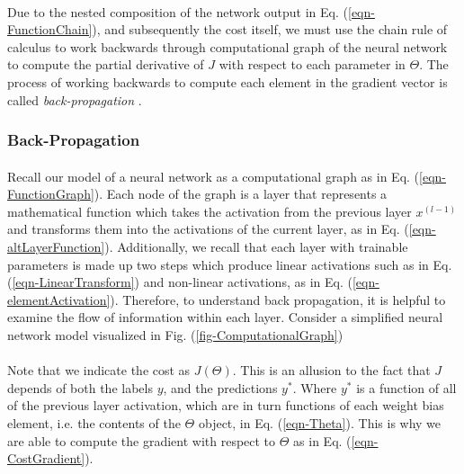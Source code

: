\documentclass[12pt,letterpaper]{article}
\begin{document}
\paragraph*{}Due to the nested composition of the network output in Eq. (\ref{eqn-FunctionChain}), and subsequently the cost itself, we must use the chain rule of calculus to work backwards through computational graph of the neural network to compute the partial derivative of $J$ with respect to each parameter in $\Theta$. The process of working backwards to compute each element in the gradient vector is called \textit{back-propagation} \cite{Geron,Goodfellow,Loy}. 




\subsubsection{Back-Propagation}
\label{subsubsec-BackProp}

\paragraph*{}Recall our model of a neural network as a computational graph as in Eq. (\ref{eqn-FunctionGraph}). Each node of the graph is a layer that represents a mathematical function which takes the activation from the previous layer $x^{(l-1)}$ and transforms them into the activations of the current layer, as in Eq. (\ref{eqn-altLayerFunction}). Additionally, we recall that each layer with trainable parameters is made up two steps which produce linear activations such as in Eq. (\ref{eqn-LinearTransform}) and non-linear activations, as in Eq. (\ref{eqn-elementActivation}). Therefore, to understand back propagation, it is helpful to examine the flow of information within each layer. Consider a simplified neural network model visualized in Fig. (\ref{fig-ComputationalGraph})

\paragraph*{}Note that we indicate the cost as $J(\Theta)$. This is an allusion to the fact that $J$ depends of both the labels $y$, and the predictions $y^*$. Where $y^*$ is a function of all of the previous layer activation, which are in turn functions of each weight bias element, i.e. the contents of the $\Theta$ object, in Eq. (\ref{eqn-Theta}). This is why we are able to compute the gradient with respect to $\Theta$ as in Eq. (\ref{eqn-CostGradient}).
\end{document}
